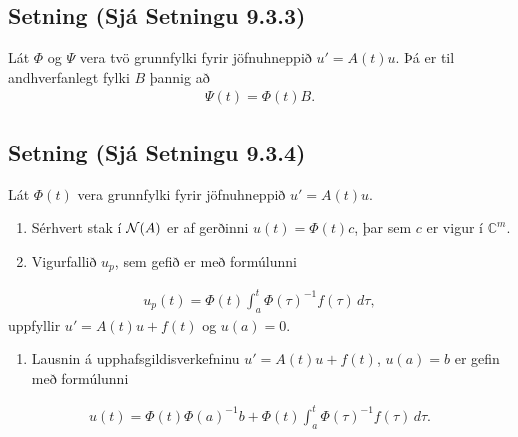 \documentclass[a4paper,10pt,icelandic]{sphinxmanual}
\begin{document}
\subsection{Setning (Sjá Setningu 9.3.3)}
\label{\detokenize{Kafli09:setning-sja-setningu-9-3-3}}
Lát \(\Phi\) og \(\Psi\) vera tvö grunnfylki fyrir jöfnuhneppið \(u'=A(t)u\). Þá er til andhverfanlegt fylki \(B\) þannig að
\begin{equation*}
\begin{split}\Psi(t)=\Phi(t)B.\label{5.3.2}\end{split}
\end{equation*}

\subsection{Setning (Sjá Setningu 9.3.4)}
\label{\detokenize{Kafli09:setning-sja-setningu-9-3-4}}
Lát \(\Phi(t)\) vera grunnfylki fyrir jöfnuhneppið \(u' =A(t)u\).
\begin{enumerate}
%
\item {} 
Sérhvert stak í \({\cal N}(A)\) er af gerðinni \(u(t)=\Phi(t)c\), þar sem \(c\) er vigur í \({\mathbb{C}}^ m\).

\item {} 
Vigurfallið \(u_p\), sem gefið er með formúlunni

\end{enumerate}
\begin{equation*}
\begin{split}u_p(t)=\Phi(t)\int_a^ t \Phi(\tau)^{-1}f(\tau)\, d\tau,\end{split}
\end{equation*}
uppfyllir \(u'=A(t)u+f(t)\) og \(u(a)=0\).
\begin{enumerate}
%
\setcounter{enumi}{2}
\item {} 
Lausnin á upphafsgildisverkefninu \(u'=A(t)u+f(t)\), \(u(a)=b\) er gefin með formúlunni

\end{enumerate}
\begin{equation*}
\begin{split}u(t)=\Phi(t)\Phi(a)^{-1}b+
\Phi(t)\int_a^ t \Phi(\tau)^{-1}f(\tau)\, d\tau.\end{split}
\end{equation*}
\end{document}
